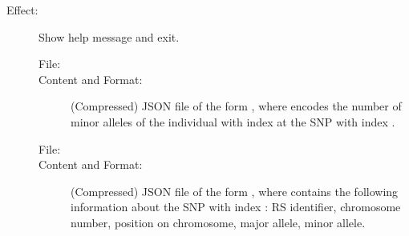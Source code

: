 \documentclass[a4paper,10pt,english]{sphinxhowto}
\begin{document}
\begin{description}
\begin{description}
\begin{description}
\end{description}

\item[{\sphinxcode{\sphinxupquote{-h, -{-}help}}}] \leavevmode\begin{description}
\item[{Effect:}] \leavevmode
Show help message and exit.

\end{description}

\end{description}

\item[{\sphinxstylestrong{Output:}}] \leavevmode\begin{description}
\item[{}] \leavevmode\begin{description}
\item[{File:}] \leavevmode
{}

\item[{Content and Format:}] \leavevmode
(Compressed) JSON file of the form ,
where  encodes the number of minor alleles of the individual with index  at the SNP with index .

\end{description}

\item[{}] \leavevmode\begin{description}
\item[{File:}] \leavevmode
{}

\item[{Content and Format:}] \leavevmode
(Compressed) JSON file of the form , where  contains the following
information about the SNP with index : RS identifier, chromosome number, position on chromosome, major allele, minor allele.


\end{description}
\end{description}
\end{description}
\end{document}
